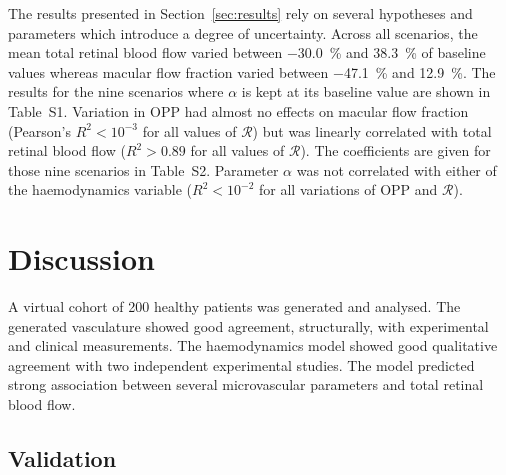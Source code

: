\documentclass[11pt,]{article}
\begin{document}
The results presented in Section~\ref{sec:results} rely on several hypotheses and parameters which introduce a degree of uncertainty.
Across all scenarios, the mean total retinal blood flow varied between \SI{-30.0}{\percent} and \SI{38.3}{\percent} of baseline values whereas macular flow fraction varied between \SI{-47.1}{\percent} and \SI{12.9}{\percent}.
The results for the nine scenarios where $\alpha$ is kept at its baseline value are shown in Table~S1.
Variation in OPP had almost no effects on macular flow fraction (Pearson's ${R^2<10^{-3}}$ for all values of $\mathcal R$) but was linearly correlated with total retinal blood flow (${R^2>0.89}$ for all values of $\mathcal R$).
The coefficients are given for those nine scenarios in Table~S2.
Parameter $\alpha$ was not correlated with either of the haemodynamics variable (${R^2<10^{-2}}$ for all variations of OPP and $\mathcal R$). 

\section{Discussion}\label{sec:discussion}

A virtual cohort of 200 healthy patients was generated and analysed. 
The generated vasculature showed good agreement, structurally, with experimental and clinical measurements.
The haemodynamics model showed good qualitative agreement with two independent experimental studies.
The model predicted strong association between several microvascular parameters and total retinal blood flow.

\subsection{Validation}\label{sec:disc-validation}
\end{document}
